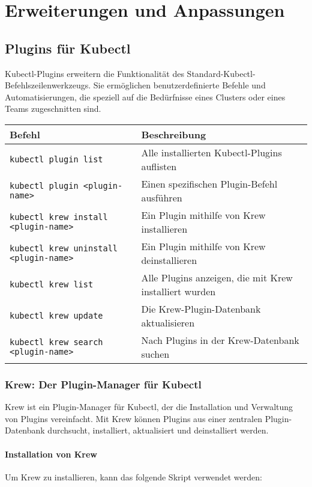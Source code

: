 \chapter{Erweiterungen und Anpassungen}

\section{Plugins für Kubectl}
Kubectl-Plugins erweitern die Funktionalität des Standard-Kubectl-Befehlszeilenwerkzeugs. Sie ermöglichen benutzerdefinierte Befehle und Automatisierungen, die speziell auf die Bedürfnisse eines Clusters oder eines Teams zugeschnitten sind. \\

\noindent
\begin{tabular}{|l|l|}
\hline
\textbf{Befehl} & \textbf{Beschreibung} \\
\hline
\texttt{kubectl plugin list} & Alle installierten Kubectl-Plugins auflisten \\
\texttt{kubectl plugin <plugin-name>} & Einen spezifischen Plugin-Befehl ausführen \\
\texttt{kubectl krew install <plugin-name>} & Ein Plugin mithilfe von Krew installieren \\
\texttt{kubectl krew uninstall <plugin-name>} & Ein Plugin mithilfe von Krew deinstallieren \\
\texttt{kubectl krew list} & Alle Plugins anzeigen, die mit Krew installiert wurden \\
\texttt{kubectl krew update} & Die Krew-Plugin-Datenbank aktualisieren \\
\texttt{kubectl krew search <plugin-name>} & Nach Plugins in der Krew-Datenbank suchen \\
\hline
\end{tabular}

\subsection{Krew: Der Plugin-Manager für Kubectl}
Krew ist ein Plugin-Manager für Kubectl, der die Installation und Verwaltung von Plugins vereinfacht. Mit Krew können Plugins aus einer zentralen Plugin-Datenbank durchsucht, installiert, aktualisiert und deinstalliert werden.

\subsubsection{Installation von Krew}
Um Krew zu installieren, kann das folgende Skript verwendet werden:



